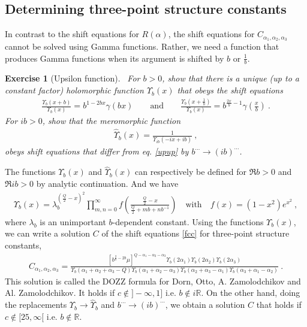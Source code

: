 \documentclass[12pt, a4paper]{article}
\theoremstyle{break}
\newtheorem{exo}{Exercise}[section]
\begin{document}
\subsection{Determining three-point structure constants}

In contrast to the shift equations for $R(\alpha)$, the shift equations for $C_{\alpha_1,\alpha_2,\alpha_3}$ cannot be solved using Gamma functions. Rather, we need a function that produces Gamma functions when its argument is shifted by $b$ or $\frac{1}{b}$. 

\begin{exo}[Upsilon function]
~\label{exo:upsilon}
 For $b>0$, show that there is a unique (up to a constant factor) holomorphic function $\Upsilon_b(x)$ that obeys the shift equations
 \begin{align}
  \frac{\Upsilon_b(x+b)}{\Upsilon_b(x)} = b^{1-2bx} \gamma(bx)\qquad \text{and} \qquad \frac{\Upsilon_b(x+\frac{1}{b})}{\Upsilon_b(x)} = b^{\frac{2x}{b}-1} \gamma(\tfrac{x}{b})\ .
\label{upup}
\end{align}
For $ib>0$, show that the meromorphic function 
\begin{align}
 \hat{\Upsilon}_b(x) = \frac{1}{\Upsilon_{ib}(-ix+ib)}\ ,
\end{align}
obeys shift equations that differ from eq. \eqref{upup} by $b^{\cdots} \to (ib)^{\cdots}$.
\end{exo}
The functions $\Upsilon_b(x)$ and $\hat\Upsilon_b(x)$ can respectively be defined for $\Re b>0$ and $\Re ib>0$ by analytic continuation. And we have 
\begin{align}
 \Upsilon_b(x) = \lambda_b^{(\frac{Q}{2}-x)^2}\prod_{m,n=0}^\infty f\left(\frac{\frac{Q}{2}-x}{\frac{Q}{2}+mb+nb^{-1}}\right) \quad \text{with} \quad f(x)=(1-x^2)e^{x^2}\ ,
\end{align}
where $\lambda_b$ is an unimportant $b$-dependent constant.
Using the functions $\Upsilon_b(x)$, we can write a solution $C$ of the shift equations \eqref{fcc} for three-point structure constants,
\begin{align}
 C_{\alpha_1,\alpha_2,\alpha_3} =  \frac{\left[b^{\frac{2}{b}-2b}\mu\right]^{Q-\alpha_1-\alpha_2-\alpha_3} \Upsilon_b(2\alpha_1) \Upsilon_b(2\alpha_2) \Upsilon_b(2\alpha_3)}{\Upsilon_b(\alpha_1+\alpha_2+\alpha_3-Q) \Upsilon_b(\alpha_1+\alpha_2-\alpha_3)\Upsilon_b(\alpha_2+\alpha_3-\alpha_1)\Upsilon_b(\alpha_3+\alpha_1-\alpha_2)} \ .
\label{caaa}
\end{align}
This solution is called the DOZZ formula for Dorn, Otto, A.
Zamolodchikov and Al. Zamolodchikov. It holds if
$c\notin ]-\infty, 1]$ i.e. $b\notin i\mathbb{R}$. 
On the other hand, doing the replacements $\Upsilon_b\to \hat\Upsilon_b$ and $b^{\cdots} \to (ib)^{\cdots}$, we obtain a solution $\hat C$ that holds if  $c\notin [25,\infty[$ i.e. $b\notin \mathbb{R}$.
\end{document}
